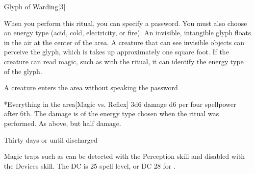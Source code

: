 \begin{spellsection}{Glyph of Warding}[3]
    \begin{spellheader}
    \end{spellheader}
    \begin{spellcontent}
        \begin{spelltargetinginfo}
        \end{spelltargetinginfo}
        \begin{spelleffects}

            \spellspecial When you perform this ritual, you can specify a password. You must also choose an energy type (acid, cold, electricity, or fire).
            \spellline
            \spelleffect An invisible, intangible glyph floats in the air at the center of the area. A creature that can see invisible objects can perceive the glyph, which is takes up approximately one square foot. If the creature can read magic, such as with the  ritual, it can identify the energy type of the glyph.
            \begin{spelltrigger}{A creature enters the area without speaking the password}
                \begin{spelltargets}*{Everything in the area}[Magic vs. Reflex]
                    \spellsuccess 3d6 damage \add d6 per four spellpower after 6th. The damage is of the energy type chosen when the ritual was performed.
                    \spellfailure As above, but half damage.
                \end{spelltargets}
            \end{spelltrigger}
            \spelldur Thirty days or until discharged
        \end{spelleffects}
    \end{spellcontent}
    \begin{spellfooter}
        \spellnotes Magic traps such as  can be detected with the Perception skill and disabled with the Devices skill. The DC is 25 \add spell level, or DC 28 for .
    \end{spellfooter}
\end{spellsection}

